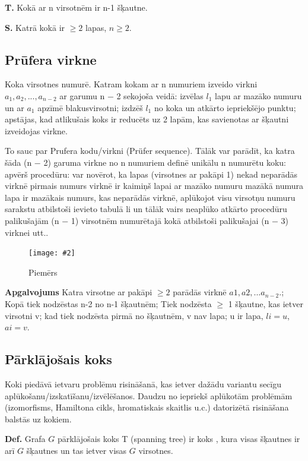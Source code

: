\documentclass{article}
\newcommand{\illustration}[3]{
	\begin{figure}[H]
		\centering	
		\texttt{[image: \#2]}
		\caption{#3}
	\end{figure}
}
\begin{document}
\textbf{T. } Kokā ar n virsotnēm ir n-1 šķautne.

\textbf{S. } Katrā kokā ir $\ge 2$ lapas, $n \ge 2$.

\subsection{Prūfera virkne}

Koka virsotnes numurē. Katram kokam ar n numuriem izveido virkni $a_1 , a_2 ,...,a_{n−2}$ ar garumu n − 2 sekojoša veidā: izvēlas $l_1$ lapu ar mazāko numuru un ar $a_1$ apzīmē blakusvirsotni; izdzēš $l_1$ no koka un atkārto iepriekšējo punktu; apstājas, kad atlikušais koks ir reducēts uz 2 lapām, kas savienotas ar šķautni izveidojas virkne. 

To sauc par Prufera kodu/virkni (Prüfer sequence).  Tālāk var parādīt, ka katra šāda (n − 2) garuma virkne no n numuriem definē unikālu n numurētu koku: apvērš procedūru: var novērot, ka lapas (virsotnes ar pakāpi 1) nekad neparādās virknē pirmais numurs virknē ir kaimiņš lapai ar mazāko numuru mazākā numura lapa ir mazākais numurs, kas neparādās virknē, aplūkojot visu virsotņu numuru sarakstu atbilstoši ievieto tabulā li un tālāk vairs neaplūko atkārto procedūru palikušajām (n − 1) virsotnēm numurētajā kokā atbilstoši palikušajai (n − 3) virknei utt..

\illustration{1}{Prufers_code-1}{Piemērs}

\textbf{Apgalvojums} Katra virsotne ar pakāpi $\ge 2$ parādās virknē $a1 , a2 , ...a_{n−2}$.;  Kopā tiek nodzēstas n-2 no n-1 šķautnēm; Tiek nodzēsta $\ge$ 1 šķautne, kas ietver virsotni v; kad tiek nodzēsta pirmā no šķautnēm, v nav lapa; u ir lapa, $li = u$, $ai = v$.

\subsection{Pārklājošais koks}

Koki piedāvā ietvaru problēmu risināšanā, kas ietver dažādu variantu secīgu aplūkošanu/izskatīšanu/izvēlēšanos.  Daudzu no iepriekš aplūkotām problēmām (izomorfisms, Hamiltona cikls, hromatiskais skaitlis u.c.) datorizētā risināšana balstās uz kokiem.

\textbf{Def.}  Grafa $ G $ pārklājošais koks T (spanning tree) ir koks , kura visas šķautnes ir arī $ G $ šķautnes un tas ietver visas $ G $ virsotnes.
\end{document}
